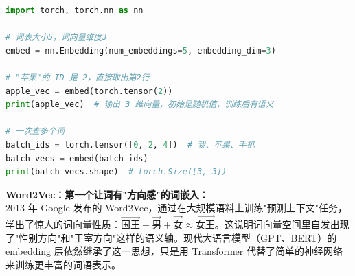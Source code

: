 \documentclass[a4paper,11pt]{ctexart}
\begin{document}
\begin{solutionbox}[参考答案与详细解析]
    \begin{lstlisting}[language=Python]
import torch, torch.nn as nn

# 词表大小5，词向量维度3
embed = nn.Embedding(num_embeddings=5, embedding_dim=3)

# "苹果"的 ID 是 2，直接取出第2行
apple_vec = embed(torch.tensor(2))
print(apple_vec)  # 输出 3 维向量，初始是随机值，训练后有语义

# 一次查多个词
batch_ids = torch.tensor([0, 2, 4])  # 我、苹果、手机
batch_vecs = embed(batch_ids)
print(batch_vecs.shape)  # torch.Size([3, 3])
    \end{lstlisting}
\end{solutionbox}

\begin{appbox}[现实应用场景]
    \textbf{Word2Vec：第一个让词有"方向感"的词嵌入：}\\
    2013 年 Google 发布的 Word2Vec，通过在大规模语料上训练"预测上下文"任务，学出了惊人的词向量性质：$\vec{\text{国王}} - \vec{\text{男}} + \vec{\text{女}} \approx \vec{\text{女王}}$。这说明词向量空间里自发出现了"性别方向"和"王室方向"这样的语义轴。现代大语言模型（GPT、BERT）的 embedding 层依然继承了这一思想，只是用 Transformer 代替了简单的神经网络来训练更丰富的词语表示。
\end{appbox}
\end{document}
